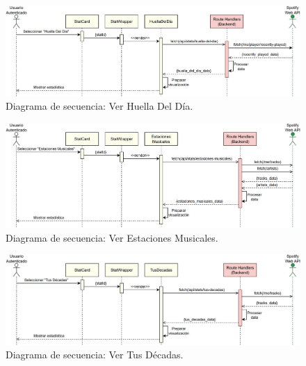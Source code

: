 \begin{figure}[H]
    \centering
    \includegraphics[width=\textwidth]{figures/diagramas_secuencia/ds_ver_huella_del_dia.png}
    \caption{Diagrama de secuencia: Ver Huella Del Día.}
    \label{fig:ds_ver_huella_del_dia}
\end{figure}

\begin{figure}[H]
    \centering
    \includegraphics[width=\textwidth]{figures/diagramas_secuencia/ds_ver_estaciones_musicales.png}
    \caption{Diagrama de secuencia: Ver Estaciones Musicales.}
    \label{fig:ds_ver_estaciones_musicales}
\end{figure}

\begin{figure}[H]
    \centering
    \includegraphics[width=\textwidth]{figures/diagramas_secuencia/ds_ver_tus_decadas.png}
    \caption{Diagrama de secuencia: Ver Tus Décadas.}
    \label{fig:ds_ver_tus_decadas}
\end{figure}

